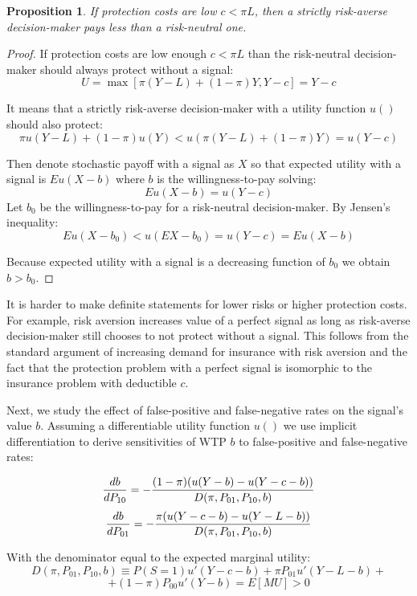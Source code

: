 \documentclass[12pt,a4paper]{article}
\newtheorem{theorem}{Proposition}
\begin{document}
\begin{theorem}
 If protection costs are low $c<\pi L$, then a strictly risk-averse decision-maker pays less than a risk-neutral one.
\end{theorem} 
\begin{proof} If protection costs are low enough $c<\pi L$ than the risk-neutral decision-maker should always protect without a signal:
$$U=\max[\pi(Y-L)+(1-\pi)Y,Y-c]=Y-c$$

It means that a strictly risk-averse decision-maker with a utility function $u()$ should also protect:
$$\pi u(Y-L)+(1-\pi)u(Y)<u(\pi(Y-L)+(1-\pi)Y)=u(Y-c)$$

Then denote stochastic payoff with a signal as $X$ so that expected utility with a signal is $Eu(X-b)$ where $b$ is the willingness-to-pay solving:
$$Eu(X-b)=u(Y-c)$$
 Let $b_0$ be the willingness-to-pay for a risk-neutral decision-maker. By Jensen's inequality:
$$Eu(X-b_0)<u(EX-b_0)=u(Y-c)=Eu(X-b)$$

Because expected utility with a signal is a decreasing function of $b_0$ we obtain $b>b_0$. \end{proof} 
It is harder to make definite statements for lower risks or higher protection costs. For example, risk aversion increases value of a perfect signal as long as risk-averse decision-maker still chooses to not protect without a signal. This follows from the standard argument of increasing demand for insurance with risk aversion and the fact that the protection problem with a perfect signal is isomorphic to the insurance problem with deductible $c$. 

Next, we study the effect of false-positive and false-negative rates on the signal's value $b$. Assuming a differentiable utility function $u()$ we use implicit differentiation to derive sensitivities of WTP $b$ to false-positive and false-negative rates:

$${db\over dP_{10}}=-{(1-\pi)(u(Y-b)-u(Y-c-b))\over D(\pi, P_{01}, P_{10}, b)}$$
$${db\over dP_{01}}=-{\pi(u(Y-c-b)-u(Y-L-b))\over D(\pi, P_{01}, P_{10}, b)}$$

With the denominator equal to the expected marginal utility:
$$D(\pi, P_{01}, P_{10}, b)\equiv P(S=1)u'(Y-c-b)+\pi P_{01}u'(Y-L-b)+$$
$$+(1-\pi)P_{00}u'(Y-b)=E[MU]>0$$
\end{document}
